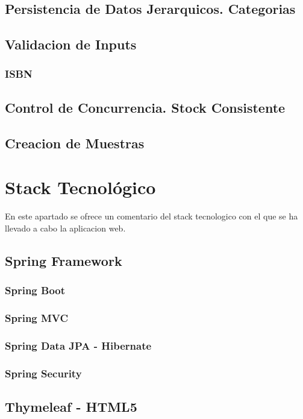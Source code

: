 \documentclass[a4paper]{report}
\begin{document}
    \subsection{Persistencia de Datos Jerarquicos. Categorias}
    \subsection{Validacion de Inputs}
    \subsubsection{ISBN}
    \subsection{Control de Concurrencia. Stock Consistente}
    \subsection{Creacion de Muestras}

    \section{Stack Tecnol\'ogico}
    En este apartado se ofrece un comentario del stack tecnologico con el que se ha llevado a cabo la aplicacion web.

    \subsection{Spring Framework}
    \subsubsection{Spring Boot}
    \subsubsection{Spring MVC}
    \subsubsection{Spring Data JPA - Hibernate}
    \subsubsection{Spring Security}
    \subsection{Thymeleaf - HTML5}
\end{document}
